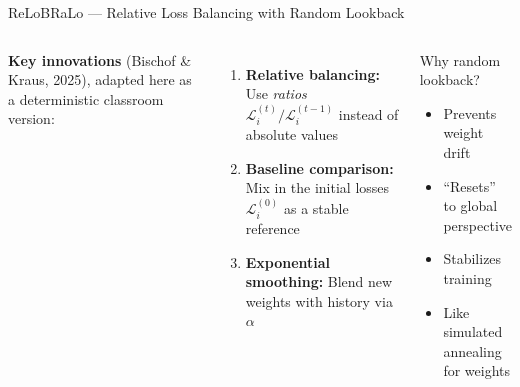 \documentclass[aspectratio=169,11pt]{beamer}
\newcommand{\emphc}[1]{\textcolor{harvardcrimson}{#1}}
\begin{document}
\begin{frame}{ReLoBRaLo --- Relative Loss Balancing with Random Lookback}
\begin{columns}[T]
\textbf{Key innovations} (Bischof \& Kraus, 2025), adapted here as a deterministic classroom version:

\vspace{0.2cm}
\begin{enumerate}
    \item \textbf{Relative balancing:} Use \emph{ratios} $\mathcal{L}_i^{(t)} / \mathcal{L}_i^{(t-1)}$ instead of absolute values

    \vspace{0.2cm}
    \item \textbf{Baseline comparison:} Mix in the \emphc{initial losses} $\mathcal{L}_i^{(0)}$ as a stable reference

    \vspace{0.2cm}
    \item \textbf{Exponential smoothing:} Blend new weights with history via $\alpha$
\end{enumerate}

\begin{block}{Why random lookback?}
\begin{itemize}
    \item Prevents weight drift
    \item ``Resets'' to global perspective
    \item Stabilizes training
    \item Like simulated annealing for weights
\end{itemize}
\end{block}
\end{columns}
\end{frame}
\end{document}
